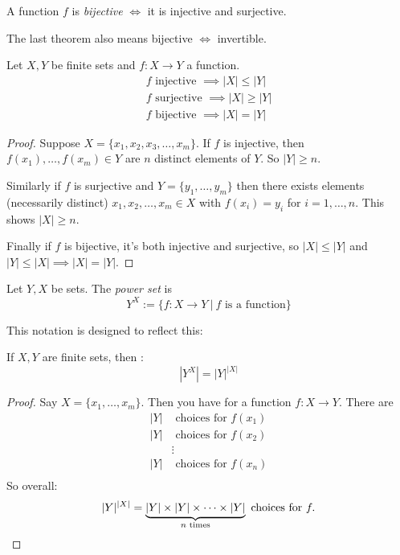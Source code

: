 \documentclass[10pt]{scrartcl}
\begin{document}
\begin{definition}
A function $f$ is \emph{bijective} $\iff$ it is injective and surjective. 
\end{definition}

The last theorem also means bijective $\iff$ invertible. \\

\begin{proposition}{\normalfont{}}
Let $X,Y$ be finite sets and $f: X \to Y$ a function. 
\[
\begin{aligned}
  f \text{ injective } \implies |X| \leq |Y|\\
  f \text{ surjective } \implies |X| \geq |Y|\\
  f \text{ bijective } \implies |X| = |Y|
\end{aligned}
\]
\end{proposition}

\begin{proof}
Suppose $X = \{x_1,x_2,x_3,\dots,x_m\}$. If $f$ is injective, then $f(x_1),\dots,f(x_m) \in Y$ are $n$ distinct elements of $Y$. So $|Y| \geq n$. 

Similarly if $f$ is surjective and $Y = \{y_1,\dots,y_m\}$ then there exists elements (necessarily distinct) $x_1,x_2,\dots,x_m \in X$ with $f(x_i) = y_i$ for $i = 1,\dots,n$. This shows $|X| \geq n$. 

Finally if $f$ is bijective, it's both injective and surjective, so $|X| \leq |Y|$ and $|Y| \leq |X| \implies |X| = |Y|$. 	
\end{proof}\vsp

\begin{definition}
Let $Y, X$ be sets. The \emph{power set} is
\[Y^X := \{f : X \to Y ~|~ f \text{ is a function} \}\]
\end{definition}

This notation is designed to reflect this: 
\begin{lemma}
If $X,Y$ are finite sets, then : 
\[|Y^X| = |Y|^{|X|}\]	
\end{lemma}

\begin{proof}
Say $X = \{x_1,\dots,x_m\}$. Then you have for a function $f: X \to Y$. 	There are
\[
\begin{aligned}
  |Y| &\text{ choices for } f(x_1)\\
  |Y| &\text{ choices for } f(x_2)\\
 &\vdots \\
  |Y| &\text{ choices for } f(x_n)\\
\end{aligned}
\]
So overall: 
\[|Y|^{|X|} = \underbrace{|Y| \times |Y| \times \dots \times |Y|}_{n \text{ times}} \text{ choices for } f.\qedhere\]
\end{proof}
\end{document}
